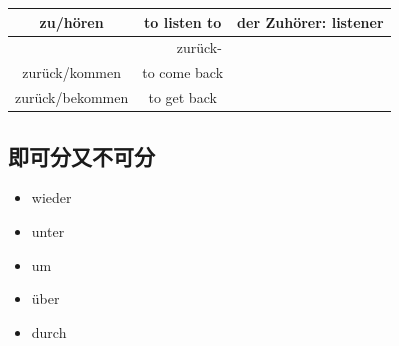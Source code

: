 \begin{center}
\begin{longtable} {|c|c|c|}
        zu/hören        & to listen to              & der Zuhörer: listener                       \\
        \hline
        \multicolumn{3}{|c|}{zurück-}                                                             \\
        \hline
        zurück/kommen   & to come back              &                                             \\
        zurück/bekommen & to get back               &                                             \\
        \hline
    \end{longtable}
\end{center}

\subsection{即可分又不可分}
\begin{itemize}
    \item wieder
    \item unter
    \item um
    \item über
    \item durch
\end{itemize}


